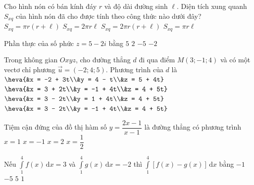\begin{ex}%
Cho hình nón có bán kính đáy $r$ và độ dài đường sinh $\ell$. Diện tích xung quanh $S_{xq}$ của hình nón đã cho được tính theo công thức nào dưới đây?
\choice
{$S_{xq} = \pi r(r + \ell)$}
{$S_{xq} = 2 \pi r\ell$}
{$S_{xq} = 2 \pi r(r +\ell)$}
{\True $S_{xq} = \pi r\ell$}
\end{ex}

\begin{ex}%
Phần thực của số phức $z = 5 - 2i$ bằng
\choice
{\True $5$}
{$2$}
{$-5$}
{$-2$}
\end{ex}

\begin{ex}%
Trong không gian $Oxyz$, cho đường thẳng $d$ đi qua điểm $M(3; -1; 4)$ và có một vectơ chỉ phương $\vec{u} = (-2; 4; 5)$. Phương trình của $d$ là
\choice
{$\heva{&x = -2 + 3t\\&y = 4 - t\\&z = 5 + 4t}$}
{$\heva{&x = 3 + 2t\\&y = -1 + 4t\\&z = 4 + 5t}$}
{$\heva{&x = 3 - 2t\\&y = 1 + 4t\\&z = 4 + 5t}$}
{\True $\heva{&x = 3 - 2t\\&y = -1 + 4t\\&z = 4 + 5t}$}
\end{ex}

\begin{ex}%
Tiệm cận đứng của đồ thị hàm số $y = \dfrac{2x - 1}{x - 1}$ là đường thẳng có phương trình
\choice
{\True $x = 1$}
{$x = -1$}
{$x = 2$}
{$x = \dfrac{1}{2}$}
\end{ex}

\begin{ex}%
Nếu $\displaystyle\int\limits_1^4 f(x) \mathrm{\,d} x=3$ và $\displaystyle\int\limits_1^4 g(x) \mathrm{\,d}x = -2$ thì $\displaystyle\int\limits_1^4[f(x)-g(x)] \mathrm{\,d}x$ bằng
\choice
{$-1$}
{$-5$}
{\True $5$}
{$1$}
\end{ex}

